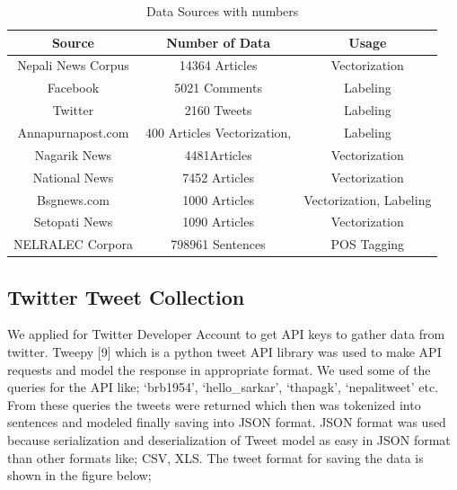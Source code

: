     \begin{table}[h]
        \caption{Data Sources with numbers}
        \begin{tabular}{|c|c|c|}
            \hline
            \textbf{Source} & \textbf{Number of Data}  & \textbf{Usage} \\\hline
            Nepali News Corpus & 14364 Articles  & Vectorization\\\hline
            Facebook & 5021 Comments & Labeling\\\hline
            Twitter & 2160 Tweets & Labeling\\\hline
            Annapurnapost.com & 400 Articles Vectorization, & Labeling\\\hline
            Nagarik News & 4481Articles & Vectorization\\\hline
            National News & 7452 Articles & Vectorization\\\hline
            Bsgnews.com & 1000 Articles & Vectorization, Labeling\\\hline
            Setopati News & 1090 Articles & Vectorization\\\hline
            NELRALEC Corpora & 798961 Sentences & POS Tagging\\\hline
        \end{tabular}
    \end{table}

            \subsection{Twitter Tweet Collection}
We applied for Twitter Developer Account to get API keys to gather data from twitter.
Tweepy
[9]
which is a python tweet API library was used to make API requests and
model the response in appropriate format. We used some of the queries for the API like;
‘brb1954’, ‘hello_sarkar’, ‘thapagk’, ‘nepalitweet’ etc. From these queries the tweets
were returned which then was tokenized into sentences and modeled finally saving into
JSON format. JSON format was used because serialization and deserialization of Tweet
model as easy in JSON format than other formats like; CSV, XLS. The tweet format
for saving the data is shown in the figure below;

